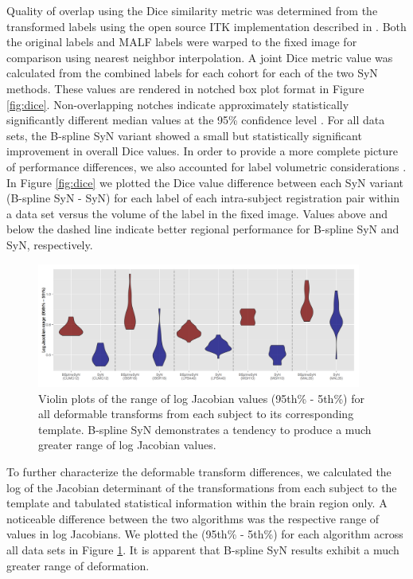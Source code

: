 \documentclass{frontiersSCNS}
\begin{document}
Quality of overlap  using the 
Dice similarity metric 
was determined from the transformed labels
using the open source ITK
implementation described in \cite{tustison2009a}.
Both the original labels and MALF labels were warped
to the fixed image for comparison using nearest neighbor
interpolation.  A joint Dice metric value was calculated
from the combined labels for each cohort for each of the
two SyN methods.  These values are rendered in notched
box plot format in Figure \ref{fig:dice}.  Non-overlapping notches
indicate approximately statistically significantly different median values
at the 95\% confidence level \citep{mcgill1978}.
For all data sets, the B-spline SyN variant showed a small but statistically
significant improvement in overall Dice values.
In order to provide a more complete picture of performance differences,
we also accounted for label volumetric considerations \citep{rohlfing2012}.  In Figure
\ref{fig:dice} we plotted the Dice value difference between each
SyN variant (B-spline SyN - SyN) for each label of each intra-subject
registration pair within a data set versus the volume of the label
in the fixed image.  Values above and below the dashed line indicate better 
regional performance for B-spline SyN and SyN, respectively.

\begin{figure}[htb]
  \centering
    \includegraphics[width=0.95\textwidth]{jacobianRange.jpg}
  \caption{Violin plots of the range of log Jacobian values 
           (95th\% - 5th\%)  
           for all deformable
           transforms from each subject to its corresponding
           template.  B-spline SyN demonstrates a tendency 
           to produce a much
           greater range of log Jacobian values.
           }
  \label{fig:jacobian}
\end{figure}

To further characterize the deformable transform differences, we 
calculated the log of the Jacobian determinant of the transformations from 
each subject to the template and 
tabulated statistical information within the brain region only. 
A noticeable difference between the two algorithms was the
respective range of values in log Jacobians.  We plotted the 
(95th\% - 5th\%) for each algorithm across all data sets
 in Figure \ref{fig:jacobian}.  It is apparent 
that B-spline SyN results exhibit a much greater range of deformation.
\end{document}
